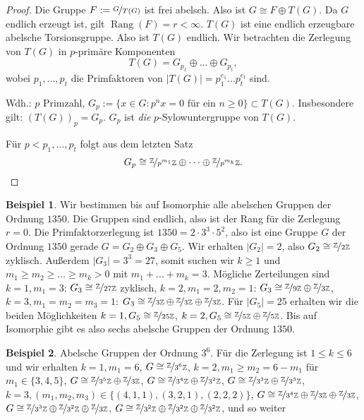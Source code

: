 \documentclass[12pt]{scrartcl} %
\DeclareMathOperator{\rank}{Rang}
\newcommand\Z{\mathbb{Z}}
\theoremstyle{definition}
\newtheorem{ex}{Beispiel}
\theoremstyle{remark}
\begin{document}
\begin{proof}
	Die Gruppe $F:=\nicefrac{G}{T(G)}$ ist frei abelsch. Also ist $G\cong F\oplus T(G)$. Da $G$ endlich erzeugt ist, gilt $\rank(F)=r<\infty$. $T(G)$ ist eine endlich erzeugbare abelsche Torsionsgruppe. Also ist $T(G)$ endlich. Wir betrachten die Zerlegung von $T(G)$ in $p$-primäre Komponenten
	\[ T(G) = G_{p_1}\oplus\dots\oplus G_{p_t}, \]
	wobei $p_1,\dots,p_t$ die Primfaktoren von $|T(G)|=p_1^{e_1}\dots p_t^{e_t}$ sind.
	
	Wdh.: $p$ Primzahl, $G_p := \{x\in G: p^nx=0\text{ für ein $n\geq 0$}\}\subset T(G)$. Insbesondere gilt: $\left(T(G)\right)_p=G_p$. $G_p$ ist \emph{die} $p$-Sylowuntergruppe von $T(G)$.
	
	Für $p<p_1,\dots,p_t$ folgt aus dem letzten Satz
		\[ G_p \cong \nicefrac{\Z}{p^{m_1}\Z}\oplus\dots\oplus\nicefrac{\Z}{p^{m_k}\Z}.\qedhere\]
\end{proof}

\begin{ex}
	Wir bestimmen bis auf Isomorphie alle abelschen Gruppen der Ordnung $1350$. Die Gruppen sind endlich, also ist der Rang für die Zerlegung $r=0$. Die Primfaktorzerlegung ist $1350=2\cdot 3^3\cdot 5^2$, also ist eine Gruppe $G$ der Ordnung $1350$ gerade $G = G_2\oplus G_3\oplus G_5$. Wir erhalten $|G_2|=2$, also $G_2\cong\nicefrac{\Z}{2\Z}$ zyklisch. Außerdem $|G_3|=3^3=27$, somit suchen wir $k\geq 1$ und $m_1\geq m_2\geq\dots\geq m_k>0$ mit $m_1+\dots +m_k=3$. Mögliche Zerteilungen sind $k=1,m_1=3$: $G_3\cong\nicefrac{\Z}{27\Z}$ zyklisch,
	 $k=2,m_1=2,m_2=1$: $G_3\cong\nicefrac{\Z}{9\Z}\oplus\nicefrac{\Z}{3\Z}$,
	 $k=3,m_1=m_2=m_3=1$: $G_3\cong\nicefrac{\Z}{3\Z}\oplus\nicefrac{\Z}{3\Z}\oplus\nicefrac{\Z}{3\Z}$. Für $|G_5|=25$ erhalten wir die beiden Möglichkeiten $k=1, G_5\cong\nicefrac{\Z}{25\Z}$, $k=2,G_5\cong\nicefrac{\Z}{5\Z}\oplus\nicefrac{\Z}{5\Z}$. Bis auf Isomorphie gibt es also sechs abelsche Gruppen der Ordnung $1350$.
\end{ex}

\begin{ex}
	Abelsche Gruppen der Ordnung $3^6$. Für die Zerlegung ist $1\leq k\leq 6$ und wir erhalten
	$k=1,m_1=6$, $G\cong\nicefrac{\Z}{3^6\Z}$,
	$k=2,m_1\geq m_2=6-m_1$ für $m_1\in\{3,4,5\}$, $G\cong\nicefrac{\Z}{3^5\Z}\oplus\nicefrac{\Z}{3\Z}$, $G\cong\nicefrac{\Z}{3^4\Z}\oplus\nicefrac{\Z}{3^2\Z}$, $G\cong\nicefrac{\Z}{3^3\Z}\oplus\nicefrac{\Z}{3^3\Z}$,
	$k=3,(m_1,m_2,m_3)\in\{(4,1,1),(3,2,1),(2,2,2)\}$, $G\cong\nicefrac{\Z}{3^4\Z}\oplus\nicefrac{\Z}{3\Z}\oplus\nicefrac{\Z}{3\Z}$, $G\cong\nicefrac{\Z}{3^3\Z}\oplus\nicefrac{\Z}{3^2\Z}\oplus\nicefrac{\Z}{3\Z}$, $G\cong\nicefrac{\Z}{3^2\Z}\oplus\nicefrac{\Z}{3^2\Z}\oplus\nicefrac{\Z}{3^2\Z}$, und so weiter %
\end{ex}
\end{document}
